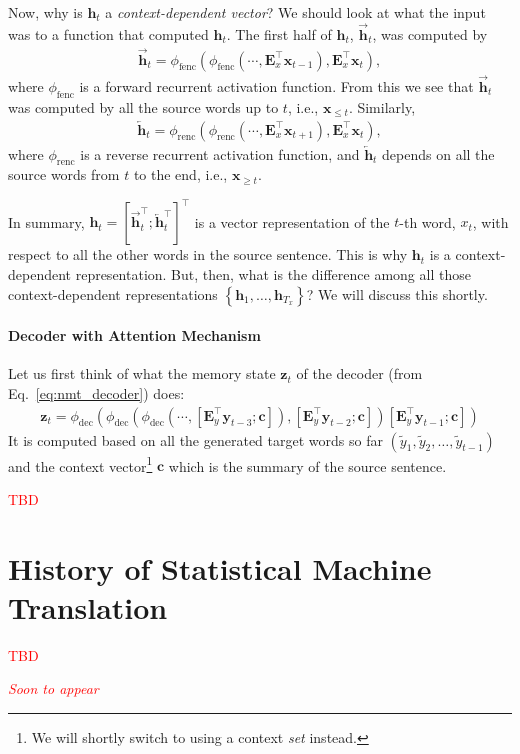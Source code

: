 \documentclass{report}
\newcommand{\vect}[1]{\mathbf{#1}}
\newcommand{\matr}[1]{\mathbf{#1}}
\newcommand{\vc}[0]{\vect{c}}
\newcommand{\vh}[0]{\vect{h}}
\newcommand{\vx}[0]{\vect{x}}
\newcommand{\vz}[0]{\vect{z}}
\newcommand{\vy}[0]{\vect{y}}
\newcommand{\mE}[0]{\matr{E}}
\newcommand{\alert}[1]{\textcolor{red}{#1}}
\newcommand{\fenc}{\text{fenc}}
\newcommand{\renc}{\text{renc}}
\newcommand{\dec}{\text{dec}}
\begin{document}
Now, why is $\vh_t$ a {\em context-dependent vector}? We should look at what the
input was to a function that computed $\vh_t$. The first half of $\vh_t$,
$\overrightarrow{\vh}_t$, was computed by
\begin{align*}
    \overrightarrow{\vh}_t = \phi_{\fenc}\left( \phi_{\fenc}\left( \cdots,
    \mE_x^\top \vx_{t-1}\right), \mE_x^\top \vx_{t}\right),
\end{align*}
where $\phi_{\fenc}$ is a forward recurrent activation function. From this we
see that $\overrightarrow{\vh}_t$ was computed by all the source words up to
$t$,
i.e., $\vx_{\leq t}$. Similarly, 
\begin{align*}
    \overleftarrow{\vh}_t = \phi_{\renc}\left( \phi_{\renc}\left( \cdots,
    \mE_x^\top \vx_{t+1}\right), \mE_x^\top \vx_{t}\right),
\end{align*}
where $\phi_{\renc}$ is a reverse recurrent activation function, and
$\overleftarrow{\vh}_t$ depends on all the source words from $t$ to the end,
i.e., $\vx_{\geq t}$. 

In summary, $\vh_{t} =\left[ \overrightarrow{\vh}_t^\top;
\overleftarrow{\vh}_t^\top \right]^\top$ is a vector representation of the
$t$-th word, $x_t$, with respect to all the other words in the source sentence.
This is why $\vh_t$ is a context-dependent representation. But, then, what is
the difference among all those context-dependent representations $\left\{
    \vh_1, \ldots, \vh_{T_x}
\right\}$? We will discuss this shortly.

\paragraph{Decoder with Attention Mechanism}

Let us first think of what the memory state $\vz_t$ of the decoder (from
Eq.~\eqref{eq:nmt_decoder}) does:
\begin{align*}
    \vz_t = \phi_{\dec}\left( 
        \phi_{\dec}\left(
            \phi_{\dec}\left(
                \cdots, 
                \left[ \mE_y^\top \vy_{t-3}; \vc \right]
            \right),
            \left[ \mE_y^\top \vy_{t-2}; \vc \right]
        \right)
        \left[ \mE_y^\top \vy_{t-1}; \vc \right]
    \right)
\end{align*} 
It is computed based on all the generated target words so far $(\tilde{y}_1,
\tilde{y}_2, \ldots, \tilde{y}_{t-1})$ and the context vector\footnote{
    We will shortly switch to using a context {\em set} instead.
}
$\vc$ which is the summary of the source sentence.











\alert{TBD}

\section{History of Statistical Machine Translation}

\alert{TBD}










\alert{\it Soon to appear}










\end{document}
